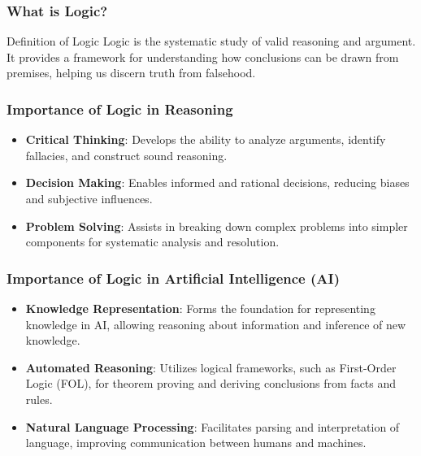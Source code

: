\documentclass[aspectratio=169]{beamer}
\begin{document}
\begin{frame}[fragile]
    \frametitle{What is Logic?}
    \begin{block}{Definition of Logic}
        Logic is the systematic study of valid reasoning and argument. 
        It provides a framework for understanding how conclusions can be drawn 
        from premises, helping us discern truth from falsehood.
    \end{block}
\end{frame}

\begin{frame}[fragile]
    \frametitle{Importance of Logic in Reasoning}
    \begin{itemize}
        \item \textbf{Critical Thinking}: Develops the ability to analyze arguments, 
        identify fallacies, and construct sound reasoning.
        
        \item \textbf{Decision Making}: Enables informed and rational decisions, 
        reducing biases and subjective influences.
        
        \item \textbf{Problem Solving}: Assists in breaking down complex problems 
        into simpler components for systematic analysis and resolution.
    \end{itemize}
\end{frame}

\begin{frame}[fragile]
    \frametitle{Importance of Logic in Artificial Intelligence (AI)}
    \begin{itemize}
        \item \textbf{Knowledge Representation}: Forms the foundation for representing 
        knowledge in AI, allowing reasoning about information and inference of new knowledge.
        
        \item \textbf{Automated Reasoning}: Utilizes logical frameworks, such as 
        First-Order Logic (FOL), for theorem proving and deriving conclusions from 
        facts and rules.
        
        \item \textbf{Natural Language Processing}: Facilitates parsing and 
        interpretation of language, improving communication between humans and machines.
    \end{itemize}
\end{frame}
\end{document}
